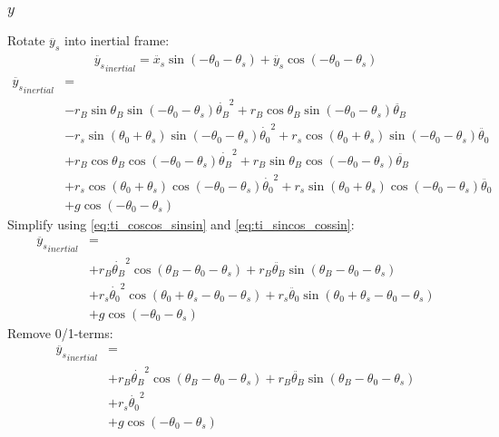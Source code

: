 \documentclass[titlepage]{article}
\numberwithin{equation}{section}
\begin{document}
\subsubsection{$y$}
Rotate $\ddot{y_s}$ into inertial frame:
\begin{align}
\ddot{y_s}_{inertial} = \ddot{x_s} \sin{(-\theta_0 - \theta_s)} + \ddot{y_s} \cos{(-\theta_0 - \theta_s)} 
\end{align}
\begin{align}
\ddot{y_s}_{inertial} &= \nonumber \\
    &- r_B \sin \theta_B \sin{(-\theta_0 - \theta_s)} \dot{\theta_B}^2
     + r_B \cos \theta_B \sin{(-\theta_0 - \theta_s)} \ddot{\theta_B} \nonumber \\
    &- r_s \sin{(\theta_0 + \theta_s)} \sin{(-\theta_0 - \theta_s)} \dot{\theta_0}^2
     + r_s \cos{(\theta_0 + \theta_s)} \sin{(-\theta_0 - \theta_s)} \ddot{\theta_0} \nonumber \\
    &+ r_B \cos \theta_B \cos{(-\theta_0 - \theta_s)} \dot{\theta_B}^2
     + r_B \sin \theta_B \cos{(-\theta_0 - \theta_s)} \ddot{\theta_B} \nonumber \\
    &+ r_s \cos{(\theta_0 + \theta_s)} \cos{(-\theta_0 - \theta_s)} \dot{\theta_0}^2
     + r_s \sin{(\theta_0 + \theta_s)} \cos{(-\theta_0 - \theta_s)} \ddot{\theta_0} \nonumber \\
    &+ g \cos{(-\theta_0 - \theta_s)}
\end{align}
Simplify using \ref{eq:ti_coscos_sinsin} and \ref{eq:ti_sincos_cossin}:
\begin{align}
\ddot{y_s}_{inertial} &= \nonumber \\
    &+ r_B \dot{\theta_B}^2 \cos{(\theta_B - \theta_0 - \theta_s)}
     + r_B \ddot{\theta_B} \sin{(\theta_B - \theta_0 - \theta_s)} \nonumber \\
    &+ r_s \dot{\theta_0}^2 \cos{(\theta_0 + \theta_s - \theta_0 - \theta_s)}
     + r_s \ddot{\theta_0} \sin{(\theta_0 + \theta_s - \theta_0 - \theta_s)} \nonumber \\
    &+ g \cos{(-\theta_0 - \theta_s)}
\end{align}
Remove 0/1-terms:
\begin{align}
\ddot{y_s}_{inertial} &= \nonumber \\
    &+ r_B \dot{\theta_B}^2 \cos{(\theta_B - \theta_0 - \theta_s)}
     + r_B \ddot{\theta_B} \sin{(\theta_B - \theta_0 - \theta_s)} \nonumber \\
    &+ r_s \dot{\theta_0}^2 \nonumber \\
    &+ g \cos{(-\theta_0 - \theta_s)}
\end{align}
\end{document}
